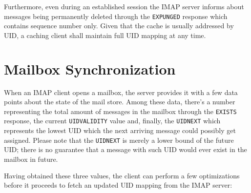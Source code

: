 \documentclass[trojita]{subfiles}
\begin{document}
Furthermore, even during an established session the IMAP server informs about messages being permanently deleted through
the {\tt EXPUNGED} response which contains sequence number only.  Given that the cache is usually addressed by UID, a
caching client shall maintain full UID mapping at any time.

\section{Mailbox Synchronization}
\label{sec:imap-mailbox-sync}

When an IMAP client opens a mailbox, the server provides it with a few data points about the state of the mail store.
Among these data, there's a number representing the total amount of messages in the mailbox through the {\tt EXISTS}
response, the current {\tt UIDVALIDITY} value and, finally, the {\tt UIDNEXT} which represents the lowest UID which the
next arriving message could possibly get assigned.  Please note that the {\tt UIDNEXT} is merely a lower bound of the
future UID; there is no guarantee that a message with such UID would ever exist in the mailbox in future.

Having obtained these three values, the client can perform a few optimizations before it proceeds to fetch an updated
UID mapping from the IMAP server:
\end{document}

